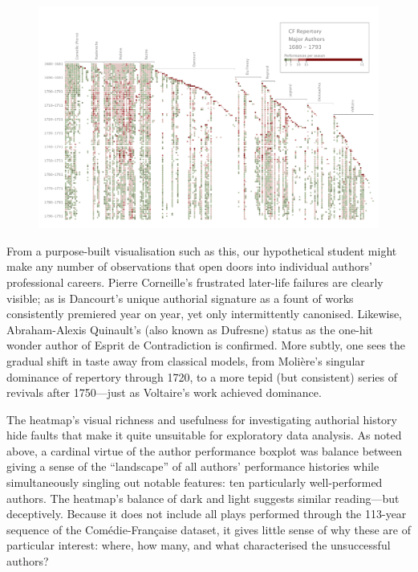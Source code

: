 \documentclass[	DIV=calc,%
							paper=a4,%
							fontsize=11pt,%
							twocolumn]{scrartcl}	 					%
\begin{document}
\begin{figure}
  \centering
	\includegraphics[width=10in,angle=270]{viz/repertoire_by_season.pdf}
	\caption{}
  \label{fig:heatmap}
\end{figure}

From a purpose-built visualisation such as this, our hypothetical student might make any number of observations that open doors into individual authors’ professional careers.  Pierre Corneille’s frustrated later-life failures are clearly visible; as is Dancourt’s unique authorial signature as a fount of works consistently premiered year on year, yet only intermittently canonised.  Likewise, Abraham-Alexis Quinault’s (also known as Dufresne) status as the one-hit wonder author of Esprit de Contradiction is confirmed.  More subtly, one sees the gradual shift in taste away from classical models, from Molière’s singular dominance of repertory through 1720, to a more tepid (but consistent) series of revivals after 1750—just as Voltaire’s work achieved dominance.

The heatmap’s visual richness and usefulness for investigating authorial history hide faults that make it quite unsuitable for exploratory data analysis.  As noted above, a cardinal virtue of the author performance boxplot was balance between giving a sense of the ``landscape'' of all authors’ performance histories while simultaneously singling out notable features: ten particularly well-performed authors.  The heatmap’s balance of dark and light suggests similar reading—but deceptively.  Because it does not include all plays performed through the 113-year sequence of the Comédie-Française dataset, it gives little sense of why these are of particular interest: where, how many, and what characterised the unsuccessful authors?
\end{document}
